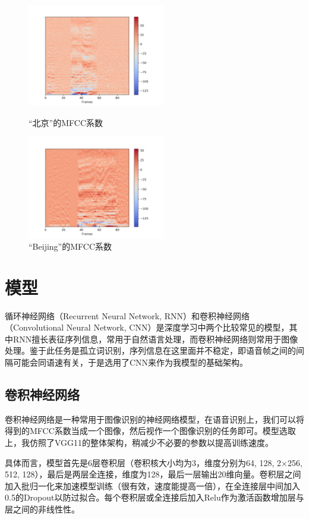 \documentclass[12pt]{article} %
\begin{document}
\begin{figure}[ht]
\centering
\begin{minipage}[t]{0.48\textwidth}
\centering
\includegraphics[width=6cm]{beijingc.png}
\caption{“北京”的MFCC系数}
\label{fig:bj}
\end{minipage}
\begin{minipage}[t]{0.48\textwidth}
\centering
\includegraphics[width=6cm]{beijing.png}
\caption{“Beijing”的MFCC系数}
\label{fig:bjc}
\end{minipage}
\end{figure}


\section{模型}
循环神经网络（Recurrent Neural Network, RNN）和卷积神经网络（Convolutional Neural Network, CNN）是深度学习中两个比较常见的模型，其中RNN擅长表征序列信息，常用于自然语言处理，而卷积神经网络则常用于图像处理。鉴于此任务是孤立词识别，序列信息在这里面并不稳定，即语音帧之间的间隔可能会同语速有关，于是选用了CNN来作为我模型的基础架构。


\subsection{卷积神经网络}
卷积神经网络是一种常用于图像识别的神经网络模型，在语音识别上，我们可以将得到的MFCC系数当成一个图像，然后视作一个图像识别的任务即可。模型选取上，我仿照了VGG11的整体架构，稍减少不必要的参数以提高训练速度。

具体而言，模型首先是6层卷积层（卷积核大小均为3，维度分别为64, 128, 2×256, 512, 128），最后是两层全连接，维度为128，最后一层输出20维向量。卷积层之间加入批归一化来加速模型训练（很有效，速度能提高一倍），在全连接层中间加入0.5的Dropout以防过拟合。每个卷积层或全连接后加入Relu作为激活函数增加层与层之间的非线性性。
\end{document}
